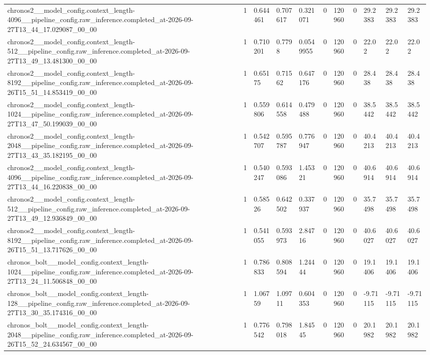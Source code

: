 \begin{tabular}{lllllllllll}
chronos2\_\_model\_config.context\_length-4096\_\_pipeline\_config.raw\_inference.completed\_at-2026-09-27T13\_44\_17.029087\_00\_00 & 1 & 0.644461 & 0.707617 & 0.321071 & 0 & 120960 & 0 & 29.2383 & 29.2383 & 29.2383 \\
chronos2\_\_model\_config.context\_length-512\_\_pipeline\_config.raw\_inference.completed\_at-2026-09-27T13\_49\_13.481300\_00\_00 & 1 & 0.710201 & 0.7798 & 0.0549955 & 0 & 120960 & 0 & 22.02 & 22.02 & 22.02 \\
chronos2\_\_model\_config.context\_length-8192\_\_pipeline\_config.raw\_inference.completed\_at-2026-09-26T15\_51\_14.853419\_00\_00 & 1 & 0.65175 & 0.71562 & 0.647176 & 0 & 120960 & 0 & 28.438 & 28.438 & 28.438 \\
chronos2\_\_model\_config.context\_length-1024\_\_pipeline\_config.raw\_inference.completed\_at-2026-09-27T13\_47\_50.199039\_00\_00 & 1 & 0.559806 & 0.614558 & 0.479488 & 0 & 120960 & 0 & 38.5442 & 38.5442 & 38.5442 \\
chronos2\_\_model\_config.context\_length-2048\_\_pipeline\_config.raw\_inference.completed\_at-2026-09-27T13\_43\_35.182195\_00\_00 & 1 & 0.542707 & 0.595787 & 0.776947 & 0 & 120960 & 0 & 40.4213 & 40.4213 & 40.4213 \\
chronos2\_\_model\_config.context\_length-4096\_\_pipeline\_config.raw\_inference.completed\_at-2026-09-27T13\_44\_16.220838\_00\_00 & 1 & 0.540247 & 0.593086 & 1.45321 & 0 & 120960 & 0 & 40.6914 & 40.6914 & 40.6914 \\
chronos2\_\_model\_config.context\_length-512\_\_pipeline\_config.raw\_inference.completed\_at-2026-09-27T13\_49\_12.936849\_00\_00 & 1 & 0.58526 & 0.642502 & 0.337937 & 0 & 120960 & 0 & 35.7498 & 35.7498 & 35.7498 \\
chronos2\_\_model\_config.context\_length-8192\_\_pipeline\_config.raw\_inference.completed\_at-2026-09-26T15\_51\_13.717626\_00\_00 & 1 & 0.541055 & 0.593973 & 2.84716 & 0 & 120960 & 0 & 40.6027 & 40.6027 & 40.6027 \\
chronos\_bolt\_\_model\_config.context\_length-1024\_\_pipeline\_config.raw\_inference.completed\_at-2026-09-27T13\_24\_11.506848\_00\_00 & 1 & 0.786833 & 0.808594 & 1.24444 & 0 & 120960 & 0 & 19.1406 & 19.1406 & 19.1406 \\
chronos\_bolt\_\_model\_config.context\_length-128\_\_pipeline\_config.raw\_inference.completed\_at-2026-09-27T13\_30\_35.174316\_00\_00 & 1 & 1.06759 & 1.09711 & 0.604353 & 0 & 120960 & 0 & -9.71115 & -9.71115 & -9.71115 \\
chronos\_bolt\_\_model\_config.context\_length-2048\_\_pipeline\_config.raw\_inference.completed\_at-2026-09-26T15\_52\_24.634567\_00\_00 & 1 & 0.776542 & 0.798018 & 1.84545 & 0 & 120960 & 0 & 20.1982 & 20.1982 & 20.1982 \\

\end{tabular}
